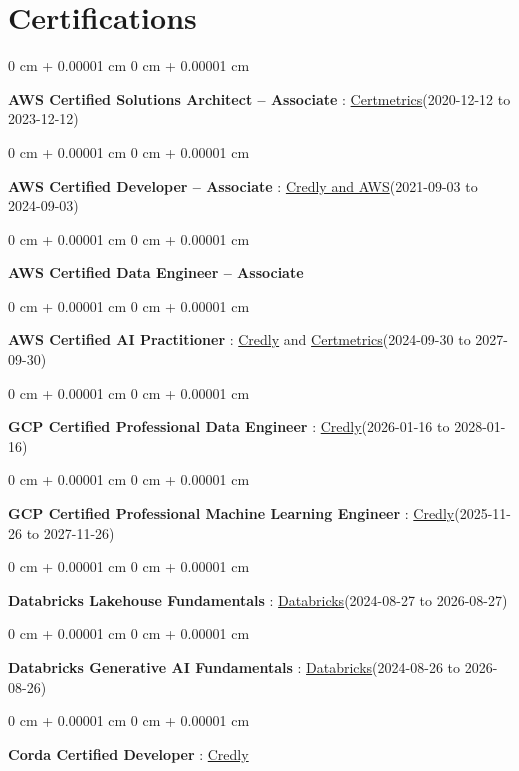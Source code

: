 \documentclass[10pt, letterpaper]{article}
\newenvironment{onecolentry}{
    \begin{adjustwidth}{
        0 cm + 0.00001 cm
    }{
        0 cm + 0.00001 cm
    }
}{
    \end{adjustwidth}
} %
\begin{document}
    \vspace{2 pt }
    \section{Certifications}
        \vspace{2 pt }
        \begin{samepage}
            \begin{onecolentry}
                \textbf{AWS Certified Solutions Architect – Associate} : \href{https://cp.certmetrics.com/amazon/en/public/verify/credential/SNBY48EBJJVE1SWX}{Certmetrics}(2020-12-12 to 2023-12-12)
            \end{onecolentry}
            \begin{onecolentry}
                \textbf{AWS Certified Developer – Associate} : \href{https://www.credly.com/badges/b8106fbd-d3d1-4204-8cdf-e708798fd582/public_url}{Credly and AWS}(2021-09-03  to 2024-09-03)
            \end{onecolentry}
            \begin{onecolentry}
                \textbf{AWS Certified Data Engineer – Associate}
            \end{onecolentry}
            \begin{onecolentry}
                \textbf{AWS Certified AI Practitioner} : \href{https://www.credly.com/badges/451b7ba5-8be1-4a8e-bbec-ade26627a6b6/public_url}{Credly} and \href{https://cp.certmetrics.com/amazon/en/public/verify/credential/495f0d9853874bf9a33c17f8e89ce131}{Certmetrics}(2024-09-30 to 2027-09-30)
            \end{onecolentry}
            \begin{onecolentry}
                \textbf{GCP Certified Professional Data Engineer} : \href{https://www.credly.com/badges/977e96d9-12e7-4f6c-b8a7-df71fb7153b8/public_url}{Credly}(2026-01-16 to 2028-01-16)
            \end{onecolentry}
            \begin{onecolentry}
                \textbf{GCP Certified Professional Machine Learning Engineer} : \href{https://www.credly.com/badges/a6965347-09ea-4d8f-b398-0e151407160d/public_url}{Credly}(2025-11-26 to 2027-11-26)
            \end{onecolentry}
            \begin{onecolentry}
                \textbf{Databricks Lakehouse Fundamentals} : \href{https://scl.io/FXGKS0u}{Databricks}(2024-08-27 to 2026-08-27)
            \end{onecolentry}
            \begin{onecolentry}
                \textbf{Databricks Generative AI Fundamentals} : \href{https://sgq.io/3uIFGNi}{Databricks}(2024-08-26 to 2026-08-26)
            \end{onecolentry}
            \begin{onecolentry}
                \textbf{Corda Certified Developer} : \href{https://www.credly.com/badges/7f29d39c-34b6-4de9-b07d-e10f1090a335/linked_in_profile}{Credly}
            \end{onecolentry}
        \end{samepage}
\end{document}
